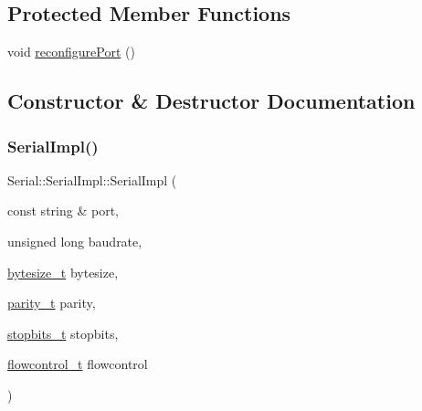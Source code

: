 \subsection*{Protected Member Functions}
\begin{DoxyCompactItemize}
\item 
void \mbox{\hyperlink{classserial_1_1serial_1_1_serial_1_1_serial_impl_ad006a2392150daddfa43ae288259c07d}{reconfigure\+Port}} ()
\end{DoxyCompactItemize}


\subsection{Constructor \& Destructor Documentation}
\mbox{\label{classserial_1_1serial_1_1_serial_1_1_serial_impl_a80885778652ea3c7f7db39ec3f20310c}} 
\subsubsection{\texorpdfstring{Serial\+Impl()}{SerialImpl()}}
{\footnotesize\ttfamily Serial\+::\+Serial\+Impl\+::\+Serial\+Impl (\begin{DoxyParamCaption}\item[{const string \&}]{port,  }\item[{unsigned long}]{baudrate,  }\item[{\mbox{\hyperlink{namespaceserial_a00b3281fa11cea770c0b0c8a106080f8}{bytesize\+\_\+t}}}]{bytesize,  }\item[{\mbox{\hyperlink{namespaceserial_a8f45d26bf7c9a06659e75b5004a50481}{parity\+\_\+t}}}]{parity,  }\item[{\mbox{\hyperlink{namespaceserial_af5b116611d6628a3aa8f788fdc09f469}{stopbits\+\_\+t}}}]{stopbits,  }\item[{\mbox{\hyperlink{namespaceserial_a93ef57a314b4e562f9eded6c15d34351}{flowcontrol\+\_\+t}}}]{flowcontrol }\end{DoxyParamCaption})}

\mbox{\label{classserial_1_1serial_1_1_serial_1_1_serial_impl_af9f0a13782d7870cf66a49001dcc64e7}} 
